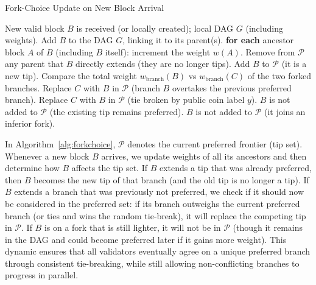 \begin{algorithm}[t]
\caption{Fork-Choice Update on New Block Arrival}\label{alg:forkchoice}
\begin{algorithmic}[1]
\Require New valid block $B$ is received (or locally created); local DAG $G$ (including weights).
\State Add $B$ to the DAG $G$, linking it to its parent(s). 
\State \textbf{for each} ancestor block $A$ of $B$ (including $B$ itself): increment the weight $w(A)$.
\State Remove from $\mathcal{P}$ any parent that $B$ directly extends (they are no longer tips).
    \State Add $B$ to $\mathcal{P}$ (it is a new tip).
    \State Compare the total weight $w_{\text{branch}}(B)$ vs $w_{\text{branch}}(C)$ of the two forked branches.
        \State Replace $C$ with $B$ in $\mathcal{P}$ (branch $B$ overtakes the previous preferred branch).
            \State Replace $C$ with $B$ in $\mathcal{P}$ (tie broken by public coin label $y$).
        \Else 
            \State $B$ is not added to $\mathcal{P}$ (the existing tip remains preferred).
        \EndIf
    \Else 
        \State $B$ is not added to $\mathcal{P}$ (it joins an inferior fork).
    \EndIf
\EndIf
\end{algorithmic}
\end{algorithm}

\noindent In Algorithm~\ref{alg:forkchoice}, $\mathcal{P}$ denotes the current preferred frontier (tip set). Whenever a new block $B$ arrives, we update weights of all its ancestors and then determine how $B$ affects the tip set. If $B$ extends a tip that was already preferred, then $B$ becomes the new tip of that branch (and the old tip is no longer a tip). If $B$ extends a branch that was previously not preferred, we check if it should now be considered in the preferred set: if its branch outweighs the current preferred branch (or ties and wins the random tie-break), it will replace the competing tip in $\mathcal{P}$. If $B$ is on a fork that is still lighter, it will not be in $\mathcal{P}$ (though it remains in the DAG and could become preferred later if it gains more weight). This dynamic ensures that all validators eventually agree on a unique preferred branch through consistent tie-breaking, while still allowing non-conflicting branches to progress in parallel. 

